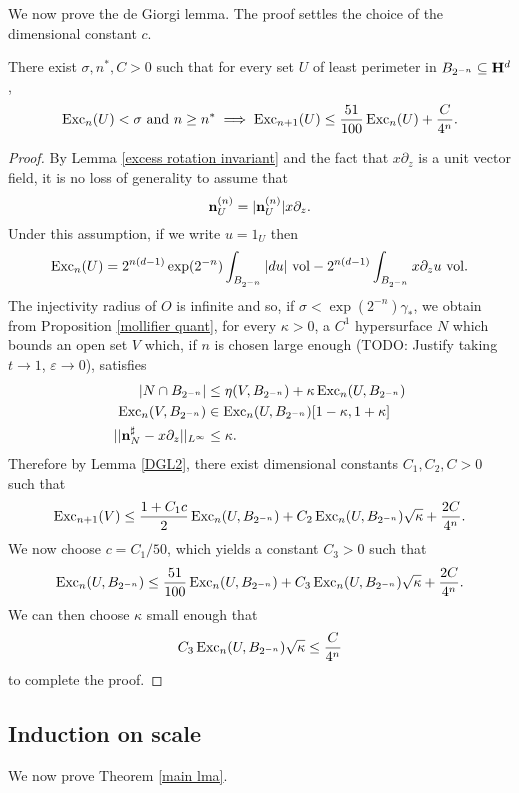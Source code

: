We now prove the de Giorgi lemma.
The proof settles the choice of the dimensional constant $c$.

\begin{proposition}\label{DGL 3}
There exist $\sigma, n^*, C > 0$ such that for every set $U$ of least perimeter in $B_{2^{-n}} \subseteq \mathbf H^d$,
$$\operatorname{Exc}_n(U) < \sigma \text{ and } n \geq n^* \implies \operatorname{Exc}_{n+1}(U) \leq \frac{51}{100} \operatorname{Exc}_n(U) + \frac{C}{4^n}.$$
\end{proposition}
\begin{proof}
By Lemma \ref{excess rotation invariant} and the fact that $x\partial_z$ is a unit vector field, it is no loss of generality to assume that
$$\mathbf n^{(n)}_U = |\mathbf n^{(n)}_U| x\partial_z.$$
Under this assumption, if we write $u = 1_U$ then
$$\operatorname{Exc}_n(U) = 2^{n(d - 1)} \exp(2^{-n}) \int_{B_{2^{-n}}} |du| ~\mathrm{vol} - 2^{n(d - 1)} \int_{B_{2^{-n}}} x\partial_z u ~\mathrm{vol}.$$
The injectivity radius of $O$ is infinite and so, if $\sigma < \exp(2^{-n}) \gamma_*$, we obtain from Proposition \ref{mollifier quant}, for every $\kappa > 0$, a $C^1$ hypersurface $N$ which bounds an open set $V$ which, if $n$ is chosen large enough (TODO: Justify taking $t \to 1$, $\varepsilon \to 0$), satisfies
\begin{align*}
|N \cap B_{2^{-n}}| &\leq \eta(V, B_{2^{-n}}) + \kappa \operatorname{Exc}_n(U, B_{2^{-n}}) \\
\operatorname{Exc}_n(V, B_{2^{-n}}) &\in \operatorname{Exc}_n(U, B_{2^{-n}})[1 - \kappa, 1 + \kappa] \\
||\mathbf n^\sharp_N - x\partial_z||_{L^\infty} &\leq \kappa.
\end{align*}
Therefore by Lemma \ref{DGL2}, there exist dimensional constants $C_1,C_2,C > 0$ such that
$$\operatorname{Exc}_{n + 1}(V) \leq \frac{1 + C_1c}{2} \operatorname{Exc}_n(U, B_{2^{-n}}) + C_2 \operatorname{Exc}_n(U, B_{2^{-n}}) \sqrt \kappa + \frac{2C}{4^n}.$$
We now choose $c = C_1/50$, which yields a constant $C_3 > 0$ such that
$$\operatorname{Exc}_n(U, B_{2^{-n}}) \leq \frac{51}{100} \operatorname{Exc}_n(U, B_{2^{-n}}) + C_3 \operatorname{Exc}_n(U, B_{2^{-n}}) \sqrt \kappa + \frac{2C}{4^n}.$$
We can then choose $\kappa$ small enough that
$$C_3 \operatorname{Exc}_n(U, B_{2^{-n}}) \sqrt \kappa \leq \frac{C}{4^n}$$
to complete the proof.
\end{proof}


\subsection{Induction on scale}
We now prove Theorem \ref{main lma}.

